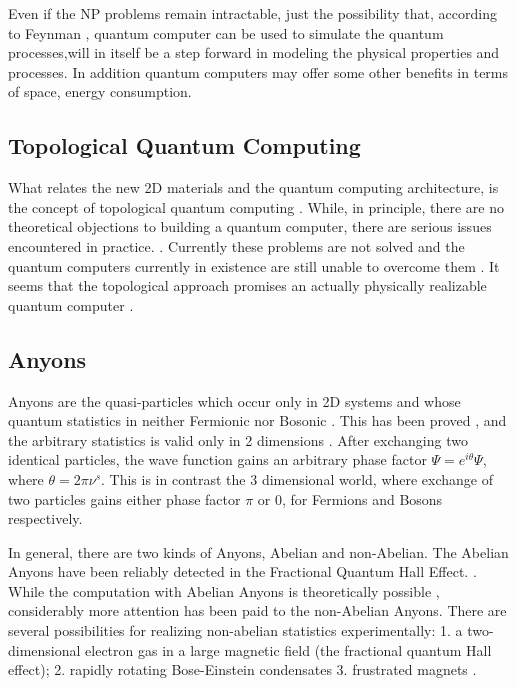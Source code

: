Even if the NP problems remain intractable, just the possibility that, according to Feynman \cite{FQC}, quantum computer can be used to simulate the quantum processes,will in itself be a step forward in modeling the physical properties and processes. In addition quantum computers may offer some other benefits in terms of space, energy consumption.

\subsection*{Topological Quantum Computing}

What relates the new 2D materials and the quantum computing architecture, is the concept of topological quantum computing \cite{Tqc1}.  While, in principle, there are no theoretical objections to building a quantum computer, there are serious issues encountered in practice. \cite{QCProblems}. Currently these problems are not solved and the quantum computers currently in existence are still unable to overcome them \cite{QCProblems}.
It seems that the topological approach promises an actually physically realizable quantum computer \cite{Tqc2,Tqc3}. 


\subsection*{Anyons}

Anyons are the quasi-particles which occur only in 2D systems and whose quantum statistics in neither Fermionic nor Bosonic \cite{Anyons1}.  This has been proved  \cite{Anyons2}, and the arbitrary statistics is valid only in 2 dimensions \cite{Walsh}. After exchanging two identical particles, the wave function gains an arbitrary phase factor $ \Psi = e^{i\theta}\Psi $, where $ \theta = 2\pi\nu^{s} $. This is in contrast the 3 dimensional world, where exchange of two particles gains either phase factor $ \pi $ or $ 0 $, for Fermions and Bosons respectively.

In general, there are two kinds of Anyons, Abelian and non-Abelian. The Abelian Anyons have been reliably detected in the Fractional Quantum Hall Effect. \cite{FQHE}.  While the computation with Abelian Anyons is theoretically possible \cite{AbelianAnyons}, considerably more attention has been paid to the non-Abelian Anyons.
There are several possibilities for realizing non-abelian statistics experimentally: 1. a two-dimensional electron gas in a large magnetic field (the fractional quantum Hall effect); 2. rapidly rotating Bose-Einstein condensates \cite{RrBeC} 3. frustrated magnets \cite{FrMag}.

